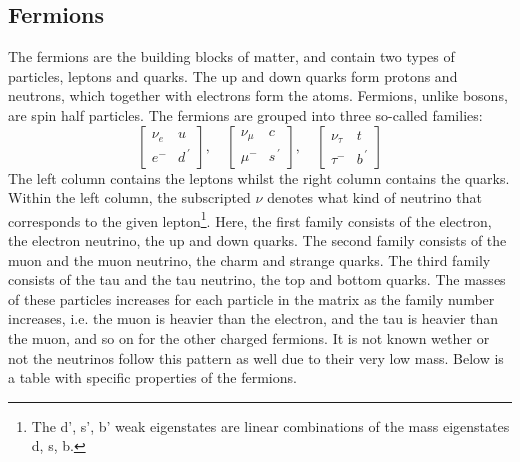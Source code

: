 \subsection*{Fermions}
The fermions are the building blocks of matter, and contain two types of particles, leptons and quarks. The up and down quarks form protons and neutrons, which together with electrons form the atoms.
Fermions, unlike bosons, are spin half particles. The fermions are grouped into three so-called families:
\begin{equation*}
    \begin{bmatrix}
        \nu_e & u \\
        e^{-} & d^{\, '} 
    \end{bmatrix},\quad
    \begin{bmatrix}
        \nu_{\mu} & c \\
        \mu^{-} & s^{\, '}
    \end{bmatrix},\quad
    \begin{bmatrix}
        \nu_{\tau} & t \\
        \tau^{-} & b^{\, '}
    \end{bmatrix}
\end{equation*}
The left column contains the leptons whilst the right column contains the quarks. Within the left column, the subscripted $\nu$ denotes what kind of neutrino that corresponds 
to the given lepton\footnote{The d', s', b' weak eigenstates are linear combinations of the mass eigenstates d, s, b.}. Here, the first family consists of the electron, the electron neutrino, the up and down quarks. The second family consists of the muon and the
muon neutrino, the charm and strange quarks. The third family consists of the tau and the tau neutrino, the top and bottom quarks. The masses of these particles 
increases for each particle in the matrix as the family number increases, i.e. the muon is heavier than the electron, and the tau is heavier than the muon, and so 
on for the other charged fermions. It is not known wether or not the neutrinos follow this pattern as well due to their very low mass. Below is a table with specific properties of the fermions.\par


